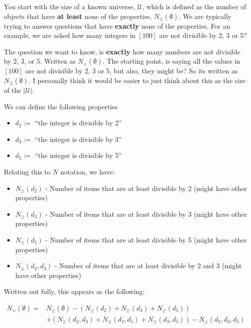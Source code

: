 \documentclass{article}
\begin{document}
You start with the size of a known universe, $\mathcal{U}$, which is defined as the number of objects that have \textbf{at least} none of the properties, $N_{\ge}(\emptyset)$. We are typically trying to answer questions that have \textbf{exactly} none of the properties. For an example, we are asked how many integers in $[100]$ are not divisible by 2, 3 or 5?

\medskip
The question we want to know, is \textbf{exactly} how many numbers are not divisible by 2, 3, or 5. Written as $N_{=}(\emptyset)$. The starting point, is saying all the values in $[100]$ are not divisible by 2, 3 or 5, but also, they might be? So its written as $N_{\ge}(\emptyset)$. I personally think it would be easier to just think about this as the size of the $|\mathcal{U}|$.

\medskip
We can define the following properties
\begin{itemize}
    \item $d_2 :=$ ``the integer is divisible by 2''
    \item $d_3 :=$ ``the integer is divisible by 3''
    \item $d_5 :=$ ``the integer is divisible by 5''
\end{itemize}

Relating this to $N$ notation, we have:
\begin{itemize}
    \item $N_{\ge}(d_2)$ - Number of items that are at least divisible by 2 (might have other properties)
    \item $N_{\ge}(d_3)$ - Number of items that are at least divisible by 3 (might have other properties)
    \item $N_{\ge}(d_5)$ - Number of items that are at least divisible by 5 (might have other properties)
    \item $N_{\ge}(d_2,d_3)$ - Number of items that are at least divisible by 2 and 3 (might have other properties)
\end{itemize}

Written out fully, this appears as the following:

\begin{equation*}
\begin{aligned}
    N_{=}(\emptyset) ={}& N_{\ge}(\emptyset) - (N_{\ge}(d_2)+N_{\ge}(d_3)+N_{\ge}(d_5)) \\
    &+ (N_{\ge}(d_2,d_3)+N_{\ge}(d_2,d_5)+N_{\ge}(d_3,d_5)) - N_{\ge}(d_2, d_3, d_5)
\end{aligned}
\end{equation*}
\end{document}
